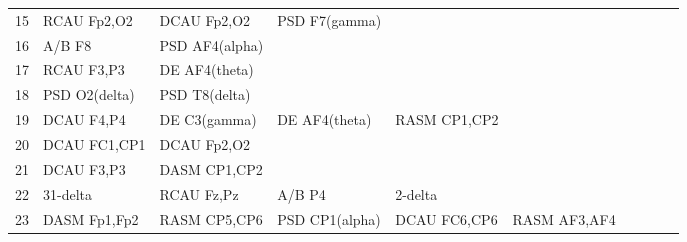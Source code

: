 \begin{landscape}
\begin{table}[]
\begin{tabular}{l|llllllll}
15       & RCAU Fp2,O2           & DCAU Fp2,O2           & PSD F7(gamma)        &                         &                         &                      &                      &                       &                       &                    \\
16       & A/B F8                & PSD AF4(alpha)        &                      &                         &                         &                      &                      &                       &                       &                    \\
17       & RCAU F3,P3            & DE AF4(theta)         &                      &                         &                         &                      &                      &                       &                       &                    \\
18       & PSD O2(delta)         & PSD T8(delta)         &                      &                         &                         &                      &                      &                       &                       &                    \\
19       & DCAU F4,P4            & DE C3(gamma)          & DE AF4(theta)        & RASM CP1,CP2            &                         &                      &                      &                       &                       &                    \\
20       & DCAU FC1,CP1          & DCAU Fp2,O2           &                      &                         &                         &                      &                      &                       &                       &                    \\
21       & DCAU F3,P3            & DASM CP1,CP2          &                      &                         &                         &                      &                      &                       &                       &                    \\
22       & 31-delta              & RCAU Fz,Pz            & A/B P4               & 2-delta                 &                         &                      &                      &                       &                       &                    \\
23       & DASM Fp1,Fp2          & RASM CP5,CP6          & PSD CP1(alpha)       & DCAU FC6,CP6            & RASM AF3,AF4            &                      &                      &                       &                       &                    \\

\end{tabular}
\end{table}
\end{landscape}
